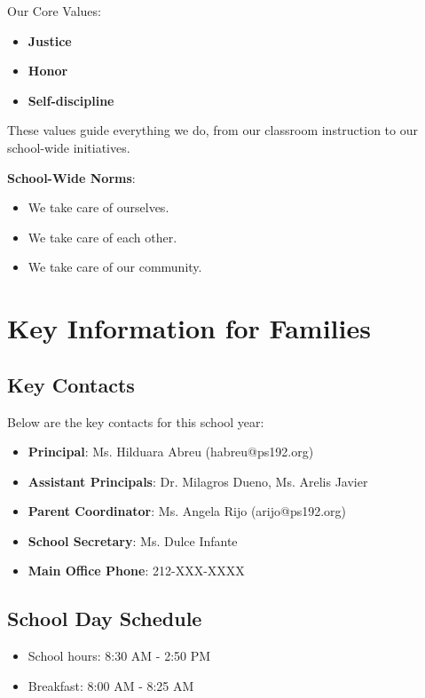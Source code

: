 \documentclass[11pt]{article}
\begin{document}
Our Core Values:
\begin{itemize}
\item \textbf{\textbf{Justice}}
\item \textbf{\textbf{Honor}}
\item \textbf{\textbf{Self-discipline}}
\end{itemize}

These values guide everything we do, from our classroom instruction to our school-wide initiatives.

\textbf{\textbf{School-Wide Norms}}:
\begin{itemize}
\item We take care of ourselves.
\item We take care of each other.
\item We take care of our community.
\end{itemize}

\section{Key Information for Families}
\label{sec:org4791e95}
\subsection{Key Contacts}
\label{sec:orgd14ab89}
Below are the key contacts for this school year:

\begin{itemize}
\item \textbf{\textbf{Principal}}: Ms. Hilduara Abreu (habreu@ps192.org)
\item \textbf{\textbf{Assistant Principals}}: Dr. Milagros Dueno, Ms. Arelis Javier
\item \textbf{\textbf{Parent Coordinator}}: Ms. Angela Rijo (arijo@ps192.org)
\item \textbf{\textbf{School Secretary}}: Ms. Dulce Infante
\item \textbf{\textbf{Main Office Phone}}: 212-XXX-XXXX
\end{itemize}

\subsection{School Day Schedule}
\label{sec:org9c544b1}
\begin{itemize}
\item School hours: 8:30 AM - 2:50 PM
\item Breakfast: 8:00 AM - 8:25 AM
\end{itemize}
\end{document}
